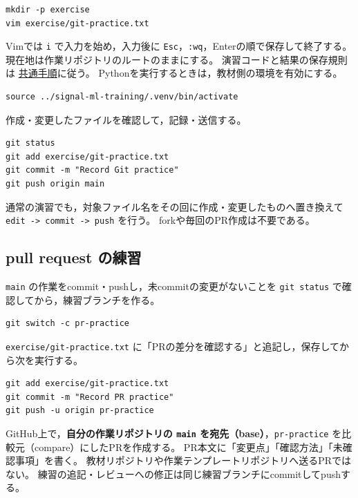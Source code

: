 \begin{lstlisting}[style=codecell]
mkdir -p exercise
vim exercise/git-practice.txt
\end{lstlisting}

Vimでは \texttt{i} で入力を始め，入力後に
\texttt{Esc}，\texttt{:wq}，Enterの順で保存して終了する。
現在地は作業リポジトリのルートのままにする。 演習コードと結果の保存規則は
\href{https://github.com/ykinolab-tokai/signal-ml-training/blob/main/handouts/README.md\#作業場所と保存先}{共通手順}に従う。
Pythonを実行するときは，教材側の環境を有効にする。

\begin{lstlisting}[style=codecell]
source ../signal-ml-training/.venv/bin/activate
\end{lstlisting}

作成・変更したファイルを確認して，記録・送信する。

\begin{lstlisting}[style=codecell]
git status
git add exercise/git-practice.txt
git commit -m "Record Git practice"
git push origin main
\end{lstlisting}

通常の演習でも，対象ファイル名をその回に作成・変更したものへ置き換えて
\texttt{edit\ -\textgreater{}\ commit\ -\textgreater{}\ push} を行う。
forkや毎回のPR作成は不要である。

\hypertarget{pull-request-ux306eux7df4ux7fd2}{%
\subsection{pull request の練習}\label{pull-request-ux306eux7df4ux7fd2}}

\texttt{main} の作業をcommit・pushし，未commitの変更がないことを
\texttt{git\ status} で確認してから，練習ブランチを作る。

\begin{lstlisting}[style=codecell]
git switch -c pr-practice
\end{lstlisting}

\texttt{exercise/git-practice.txt}
に「PRの差分を確認する」と追記し，保存してから次を実行する。

\begin{lstlisting}[style=codecell]
git add exercise/git-practice.txt
git commit -m "Record PR practice"
git push -u origin pr-practice
\end{lstlisting}

GitHub上で，\textbf{自分の作業リポジトリの \texttt{main}
を宛先（base）}，\texttt{pr-practice}
を比較元（compare）にしたPRを作成する。
PR本文に「変更点」「確認方法」「未確認事項」を書く。
教材リポジトリや作業テンプレートリポジトリへ送るPRではない。
練習の追記・レビューへの修正は同じ練習ブランチにcommitしてpushする。

